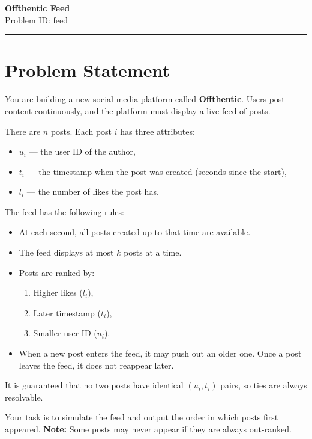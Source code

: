 \documentclass[12pt,a4paper]{article}
\begin{document}
\ifdefined\BOOKLET
  \pagestyle{empty}
\fi

\begin{center}
    {\LARGE \textbf{Offthentic Feed}} \\[0.5em]
    {Problem ID: feed} \\[1em]
    \rule{\textwidth}{0.4pt}
\end{center}

\vspace{1em}

\section*{Problem Statement}
You are building a new social media platform called \textbf{Offthentic}. Users post content continuously, and the platform must display a live feed of posts.  

There are $n$ posts. Each post $i$ has three attributes:
\begin{itemize}
    \item $u_i$ — the user ID of the author,  
    \item $t_i$ — the timestamp when the post was created (seconds since the start),  
    \item $l_i$ — the number of likes the post has.  
\end{itemize}

The feed has the following rules:
\begin{itemize}
    \item At each second, all posts created up to that time are available.  
    \item The feed displays at most $k$ posts at a time.  
    \item Posts are ranked by:
        \begin{enumerate}
            \item Higher likes ($l_i$),  
            \item Later timestamp ($t_i$),  
            \item Smaller user ID ($u_i$).  
        \end{enumerate}
    \item When a new post enters the feed, it may push out an older one. Once a post leaves the feed, it does not reappear later.  
\end{itemize}

It is guaranteed that no two posts have identical $(u_i, t_i)$ pairs, so ties are always resolvable.  

Your task is to simulate the feed and output the order in which posts first appeared.  
\textbf{Note:} Some posts may never appear if they are always out-ranked.
\end{document}
